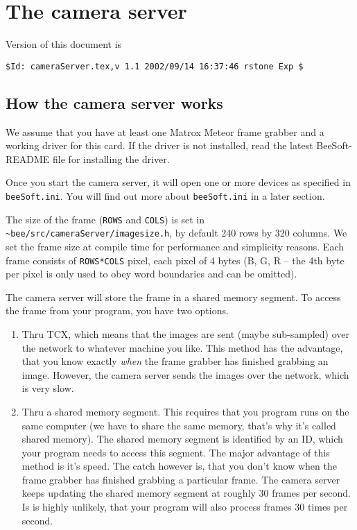 \documentclass{article}
\begin{document}
\section{The camera server}

Version of this document is
\begin{verbatim}
$Id: cameraServer.tex,v 1.1 2002/09/14 16:37:46 rstone Exp $
\end{verbatim}
 
\subsection{How the camera server works} 

We assume that you have at least one Matrox Meteor frame grabber and a working
driver for this card. If the driver is not installed, read the latest
BeeSoft-README file for installing the driver.
 
Once you start the camera server, it will open one or more devices as
specified in \texttt{beeSoft.ini}. You will find out more about
\texttt{beeSoft.ini} in a later section.
 
The size of the frame (\texttt{ROWS} and \texttt{COLS}) is set in
\texttt{\~{}bee/src/cameraServer/imagesize.h}, by default 240 rows by 320
columns. We set the frame size at compile time for performance and simplicity
reasons. Each frame consists of \texttt{ROWS*COLS} pixel, each pixel of 4
bytes (B, G, R -- the 4th byte per pixel is only used to obey word boundaries
and can be omitted).

The camera server will store the frame in a shared memory segment. To access
the frame from your program, you have two options.

\begin{enumerate}
  
\item Thru TCX, which means that the images are sent (maybe sub-sampled) over
  the network to whatever machine you like. This method has the advantage,
  that you know exactly \emph{when} the frame grabber has finished grabbing an
  image.  However, the camera server sends the images over the network, which
  is very slow.
  
\item Thru a shared memory segment. This requires that you program runs on the
  same computer (we have to share the same memory, that's why it's called
  shared memory). The shared memory segment is identified by an ID, which your
  program needs to access this segment. The major advantage of this method is
  it's speed. The catch however is, that you don't know when the frame grabber
  has finished grabbing a particular frame. The camera server keeps updating
  the shared memory segment at roughly 30 frames per second. Is is highly
  unlikely, that your program will also process frames 30 times per second.

\end{enumerate}
 
\end{document}
